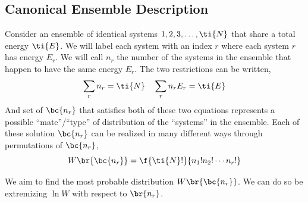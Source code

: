 \documentclass{article}
\begin{document}
\begin{center}
\end{center}

\subsection{Canonical Ensemble Description}

Consider an ensemble of identical systems $1,2,3,\ldots,\ti{N}$ that share a total energy $\ti{E}$. We will label each system with an index $r$ where each system $r$ has energy $E_r$. We will call $n_r$ the number of the systems in the ensemble that happen to have the same energy $E_r$. The two restrictions can be written,
\[ \sum_{r} n_r = \ti{N} \quad \sum_{r} n_r E_r = \ti{E} \]
And set of $\bc{n_r}$ that satisfies both of these two equations represents a possible ``mate''/``type'' of distribution of the ``systems'' in the ensemble. Each of these solution $\bc{n_r}$ can be realized in many different ways through permutations of $\bc{n_r}$,
\[ W\br{\bc{n_r}} = \f{\ti{N}!}{n_1!n_2!\cdots n_r!}\]

We aim to find the most probable distribution $W\br{\bc{n_r}}$. We can do so be extremizing $\ln W$ with respect to $\br{n_r}$.
\end{document}
